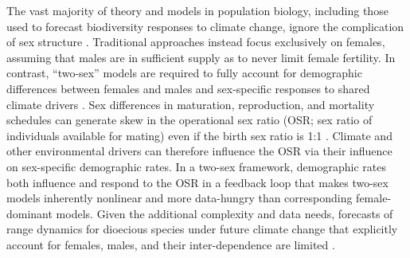 \documentclass[9pt,twocolumn,twoside,lineno]{pnas-new}
\begin{document}
The vast majority of theory and models in population biology, including those used to forecast biodiversity responses to climate change, ignore the complication of sex structure \citep[but see][] {pottier2021sexual,ellis2017does,Elena}.
Traditional approaches instead focus exclusively on females, assuming that males are in sufficient supply as to never limit female fertility. 
In contrast, ``two-sex'' models are required to fully account for demographic differences between females and males and sex-specific responses to shared climate drivers \citep{gerber2014two,miller2011sex}. 
Sex differences in maturation, reproduction, and mortality schedules can generate skew in the operational sex ratio (OSR; sex ratio of individuals available for mating) even if the birth sex ratio is 1:1 \citep{eberhart2017sex,shelton2010ecological}. 
Climate and other environmental drivers can therefore influence the OSR via their influence on sex-specific demographic rates. 
In a two-sex framework, demographic rates both influence and respond to the OSR in a feedback loop that makes two-sex models inherently nonlinear and more data-hungry than corresponding female-dominant models. 
Given the additional complexity and data needs, forecasts of range dynamics for dioecious species under future climate change that explicitly account for females, males, and their inter-dependence are limited \citep{petry2016sex,lynch2014climate}.
\end{document}
